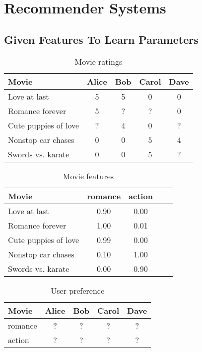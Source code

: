 \chapter{Recommender Systems}
\section{Given Features To Learn Parameters}
\begin{table}[H]
    \caption{Movie ratings}
    \centering
    \begin{tabular}{lcccc}
        \hline %
        Movie                & Alice & Bob & Carol & Dave \\ 
        \hline %
        Love at last         & 5     & 5   & 0     & 0    \\ 
        Romance forever      & 5     & ?   & ?     & 0    \\ 
        Cute puppies of love & ?     & 4   & 0     & ?    \\ 
        Nonstop car chases   & 0     & 0   & 5     & 4    \\ 
        Swords vs. karate    & 0     & 0   & 5     & ?    \\ 
        \hline %
    \end{tabular}
\end{table} 


\begin{table}[H]
    \caption{Movie features}
    \centering
    \begin{tabular}{lcccc}
        \hline %
        Movie                & romance & action \\ 
        \hline %
        Love at last         & 0.90    & 0.00   \\ 
        Romance forever      & 1.00    & 0.01   \\ 
        Cute puppies of love & 0.99    & 0.00   \\ 
        Nonstop car chases   & 0.10    & 1.00   \\ 
        Swords vs. karate    & 0.00    & 0.90   \\ 
        \hline %
    \end{tabular}
\end{table} 


\begin{table}[H]
    \caption{User preference}
    \centering
    \begin{tabular}{lcccc}
        \hline %
        Movie       & Alice & Bob & Carol & Dave \\ 
        \hline %
        romance     & ?     & ?   & ?     & ?    \\ 
        action      & ?     & ?   & ?     & ?    \\ 
        \hline %
    \end{tabular}
\end{table} 


